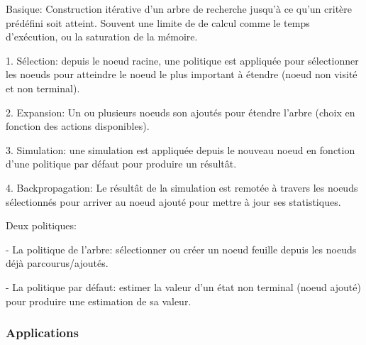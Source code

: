 Basique: Construction itérative d'un arbre de recherche jusqu'à ce qu'un critère prédéfini soit atteint. Souvent une limite de de calcul comme le temps d'exécution, ou la saturation de la mémoire.

1. Sélection: depuis le noeud racine, une politique est appliquée pour sélectionner les noeuds pour atteindre le noeud le plus important à étendre (noeud non visité et non terminal).

2. Expansion: Un ou plusieurs noeuds son ajoutés pour étendre l'arbre (choix en fonction des actions disponibles).

3. Simulation: une simulation est appliquée depuis le nouveau noeud en fonction d'une politique par défaut pour produire un résultât.

4. Backpropagation: Le résultât de la simulation est remotée à travers les noeuds sélectionnés pour arriver au noeud ajouté pour mettre à jour ses statistiques.

Deux politiques: 

- La politique de l'arbre: sélectionner ou créer un noeud feuille depuis les noeuds déjà parcourus/ajoutés.

- La politique par défaut: estimer la valeur d'un état non terminal (noeud ajouté) pour produire une estimation de sa valeur.


\subsubsection{Applications}




